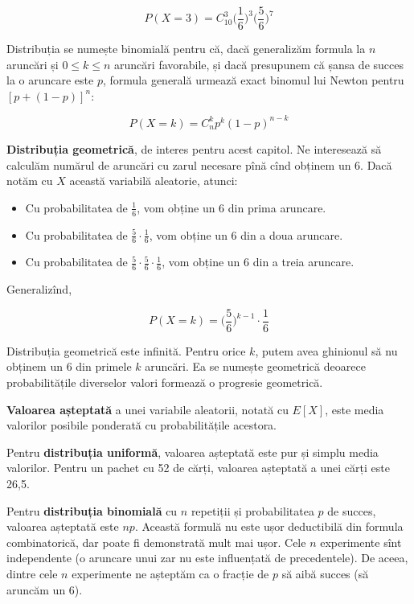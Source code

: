 \documentclass[../main.tex]{subfiles}
\begin{document}
$$P(X = 3) = C_{10}^{3} \bigg(\frac{1}{6}\bigg)^3 \bigg(\frac{5}{6}\bigg)^7$$

Distribuția se numește binomială pentru că, dacă generalizăm formula la $n$ aruncări și $0 \leq k \leq n$ aruncări favorabile, și dacă presupunem că șansa de succes la o aruncare este $p$, formula generală urmează exact binomul lui Newton pentru $[p + (1 - p)]^n$:

$$P(X = k) = C_{n}^{k} p^k (1-p)^{n-k}$$


\textbf{Distribuția geometrică}, de interes pentru acest capitol. Ne interesează să calculăm numărul de aruncări cu zarul necesare pînă cînd obținem un 6. Dacă notăm cu $X$ această variabilă aleatorie, atunci:

\begin{itemize}
  \item Cu probabilitatea de $\frac{1}{6}$, vom obține un 6 din prima aruncare.
  \item Cu probabilitatea de $\frac{5}{6} \cdot \frac{1}{6}$, vom obține un 6 din a doua aruncare.
  \item Cu probabilitatea de $\frac{5}{6} \cdot \frac{5}{6} \cdot \frac{1}{6}$, vom obține un 6 din a treia aruncare.
\end{itemize}

Generalizînd,

$$P(X = k) = \bigg(\frac{5}{6}\bigg)^{k - 1} \cdot \frac{1}{6}$$

Distribuția geometrică este infinită. Pentru orice $k$, putem avea ghinionul să nu obținem un 6 din primele $k$ aruncări. Ea se numește geometrică deoarece probabilitățile diverselor valori formează o progresie geometrică.

\textbf{Valoarea așteptată} a unei variabile aleatorii, notată cu $E[X]$, este media valorilor posibile ponderată cu probabilitățile acestora.

Pentru \textbf{distribuția uniformă}, valoarea așteptată este pur și simplu media valorilor. Pentru un pachet cu 52 de cărți, valoarea așteptată a unei cărți este 26,5.

Pentru \textbf{distribuția binomială} cu $n$ repetiții și probabilitatea $p$ de succes, valoarea așteptată este $np$. Această formulă nu este ușor deductibilă din formula combinatorică, dar poate fi demonstrată mult mai ușor. Cele $n$ experimente sînt independente (o aruncare unui zar nu este influențată de precedentele). De aceea, dintre cele $n$ experimente ne așteptăm ca o fracție de $p$ să aibă succes (să aruncăm un 6).
\end{document}
